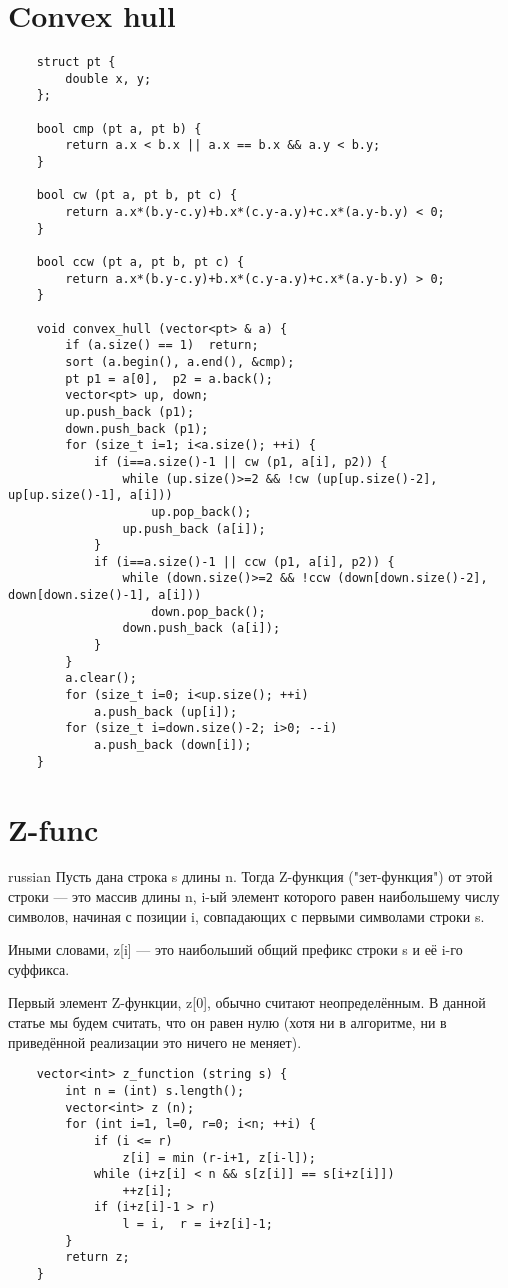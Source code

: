 \documentclass{article}
\begin{document}
\section{Convex hull}
\begin{verbatim}
    struct pt {
        double x, y;
    };

    bool cmp (pt a, pt b) {
        return a.x < b.x || a.x == b.x && a.y < b.y;
    }

    bool cw (pt a, pt b, pt c) {
        return a.x*(b.y-c.y)+b.x*(c.y-a.y)+c.x*(a.y-b.y) < 0;
    }

    bool ccw (pt a, pt b, pt c) {
        return a.x*(b.y-c.y)+b.x*(c.y-a.y)+c.x*(a.y-b.y) > 0;
    }

    void convex_hull (vector<pt> & a) {
        if (a.size() == 1)  return;
        sort (a.begin(), a.end(), &cmp);
        pt p1 = a[0],  p2 = a.back();
        vector<pt> up, down;
        up.push_back (p1);
        down.push_back (p1);
        for (size_t i=1; i<a.size(); ++i) {
            if (i==a.size()-1 || cw (p1, a[i], p2)) {
                while (up.size()>=2 && !cw (up[up.size()-2], up[up.size()-1], a[i]))
                    up.pop_back();
                up.push_back (a[i]);
            }
            if (i==a.size()-1 || ccw (p1, a[i], p2)) {
                while (down.size()>=2 && !ccw (down[down.size()-2], down[down.size()-1], a[i]))
                    down.pop_back();
                down.push_back (a[i]);
            }
        }
        a.clear();
        for (size_t i=0; i<up.size(); ++i)
            a.push_back (up[i]);
        for (size_t i=down.size()-2; i>0; --i)
            a.push_back (down[i]);
    }
\end{verbatim}

\section{Z-func}
\begin{otherlanguage*}{russian}
    Пусть дана строка s длины n. Тогда Z-функция ("зет-функция") от этой строки — это массив длины n, i-ый элемент которого равен наибольшему числу символов, начиная с позиции i, совпадающих с первыми символами строки s.

    Иными словами, z[i] — это наибольший общий префикс строки s и её i-го суффикса.

    Первый элемент Z-функции, z[0], обычно считают неопределённым. В данной статье мы будем считать, что он равен нулю (хотя ни в алгоритме, ни в приведённой реализации это ничего не меняет).
\end{otherlanguage*}
\begin{verbatim}
    vector<int> z_function (string s) {
        int n = (int) s.length();
        vector<int> z (n);
        for (int i=1, l=0, r=0; i<n; ++i) {
            if (i <= r)
                z[i] = min (r-i+1, z[i-l]);
            while (i+z[i] < n && s[z[i]] == s[i+z[i]])
                ++z[i];
            if (i+z[i]-1 > r)
                l = i,  r = i+z[i]-1;
        }
        return z;
    }
\end{verbatim}
\end{document}
